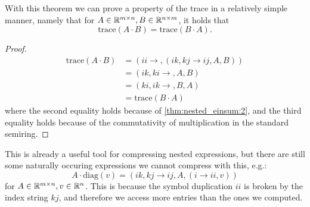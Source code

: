 

With this theorem we can prove a property of the trace in a relatively simple manner, namely that for $A \in \mathbb{R}^{m \times n}, B \in \mathbb{R}^{n \times m}$,
it holds that
$$\text{trace}(A \cdot B) = \text{trace}(B \cdot A).$$

\begin{proof}
    \small
    \begin{align*}
        \text{trace}(A \cdot B) & = (ii \rightarrow , (ik,kj \rightarrow ij, A, B)) \\
                                & = (ik, ki \rightarrow ,A, B)                      \\
                                & = (ki, ik \rightarrow ,B, A)                      \\
                                & = \text{trace}(B \cdot A)
    \end{align*}
    where the second equality holds because of \autoref{thm:nested_einsum:2},
    and the third equality holds because of the commutativity of multiplication in the standard semiring.
\end{proof}
\bigskip

This is already a useful tool for compressing nested expressions, but there are still some naturally occuring expressions we cannot compress with this,
e.g.:
$$A \cdot \text{diag}(v) = (ik, kj \rightarrow ij, A, (i \rightarrow ii, v))$$
for $A \in \mathbb{R}^{m \times n}, v \in \mathbb{R}^{n}$.
This is because the symbol duplication $ii$ is broken by the index string $kj$, and therefore we access more entries than the ones we computed.

